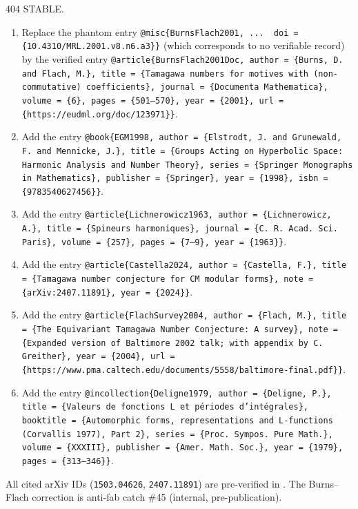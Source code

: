 \medskip
{} 404 STABLE.

\medskip
{}

\begin{enumerate}[label=\arabic*., leftmargin=*]
\item Replace the phantom entry
   \texttt{@misc\{BurnsFlach2001, ...\, doi = \{10.4310/MRL.2001.v8.n6.a3\}\}}
   (which corresponds to no verifiable record) by the verified entry
   \texttt{@article\{BurnsFlach2001Doc,
   author = \{Burns, D. and Flach, M.\},
   title = \{Tamagawa numbers for motives with (non-commutative) coefficients\},
   journal = \{Documenta Mathematica\}, volume = \{6\}, pages = \{501--570\},
   year = \{2001\}, url = \{https://eudml.org/doc/123971\}\}}.
\item Add the entry
   \texttt{@book\{EGM1998, author = \{Elstrodt, J. and Grunewald, F. and Mennicke, J.\},
   title = \{Groups Acting on Hyperbolic Space: Harmonic Analysis and Number Theory\},
   series = \{Springer Monographs in Mathematics\}, publisher = \{Springer\},
   year = \{1998\}, isbn = \{9783540627456\}\}}.
\item Add the entry
   \texttt{@article\{Lichnerowicz1963, author = \{Lichnerowicz, A.\},
   title = \{Spineurs harmoniques\},
   journal = \{C. R. Acad. Sci. Paris\}, volume = \{257\}, pages = \{7--9\},
   year = \{1963\}\}}.
\item Add the entry
   \texttt{@article\{Castella2024, author = \{Castella, F.\},
   title = \{Tamagawa number conjecture for CM modular forms\},
   note = \{arXiv:2407.11891\}, year = \{2024\}\}}.
\item Add the entry
   \texttt{@article\{FlachSurvey2004, author = \{Flach, M.\},
   title = \{The Equivariant Tamagawa Number Conjecture: A survey\},
   note = \{Expanded version of Baltimore 2002 talk; with appendix by C. Greither\},
   year = \{2004\}, url = \{https://www.pma.caltech.edu/documents/5558/baltimore-final.pdf\}\}}.
\item Add the entry
   \texttt{@incollection\{Deligne1979, author = \{Deligne, P.\},
   title = \{Valeurs de fonctions L et p\'eriodes d'int\'egrales\},
   booktitle = \{Automorphic forms, representations and L-functions (Corvallis 1977), Part 2\},
   series = \{Proc. Sympos. Pure Math.\}, volume = \{XXXIII\},
   publisher = \{Amer. Math. Soc.\}, year = \{1979\}, pages = \{313--346\}\}}.
\end{enumerate}

\noindent All cited arXiv IDs (\texttt{1503.04626}, \texttt{2407.11891})
are pre-verified in \cite[\S M.G.2]{BIGTABLE2026}.  The Burns--Flach
correction is anti-fab catch \#45 (internal, pre-publication).

